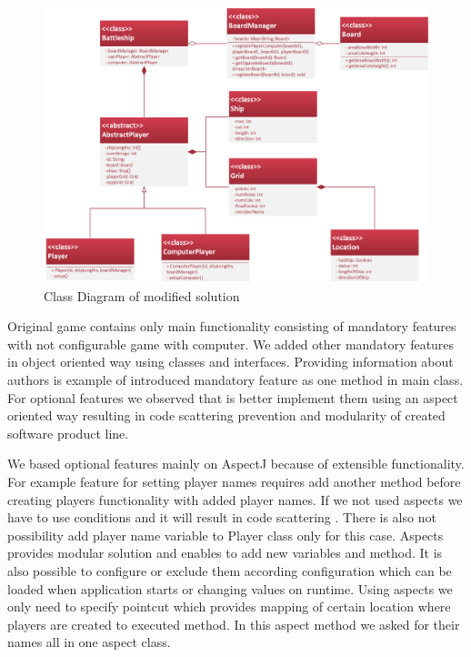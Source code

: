 \documentclass[11pt,english,a4paper,twoside]{article}
\begin{document}
\begin{figure}[t]  %
					\begin{center}
									\includegraphics[width=\linewidth]{fig/refactoredSchema.png}
									\caption{Class Diagram of modified solution}
									\label{refactoredSchema}
					\end{center}
\end{figure}

Original game contains only main functionality consisting of mandatory features with not configurable game with computer. We added other mandatory features in object oriented way using classes and interfaces. Providing information about authors is example of introduced mandatory feature as one method in main class. For optional features we observed that is better implement them using an aspect oriented way resulting in code scattering prevention and modularity of created software product line. 

We based optional features mainly on AspectJ because of extensible functionality. For example feature for setting player names requires add another method before creating players functionality with added player names. If we not used aspects we have to use conditions and it will result in code scattering \cite{laddad_aspectj_2003}. There is also not possibility add player name variable to Player class only for this case. Aspects provides modular solution and enables to add new variables and method. It is also possible to configure or exclude them according configuration which can be loaded when application starts or changing values on runtime. Using aspects we only need to specify pointcut which provides mapping of certain location where players are created  to executed method. In this aspect method we asked for their names all in one aspect class. 
\end{document}
